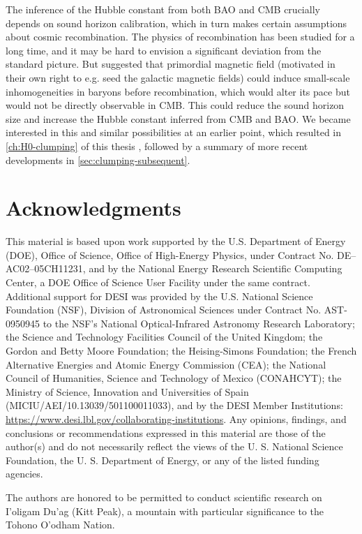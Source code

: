 The inference of the Hubble constant from both BAO and CMB crucially depends on sound horizon calibration, which in turn makes certain assumptions about cosmic recombination.
The physics of recombination has been studied for a long time, and it may be hard to envision a significant deviation from the standard picture.
But \cite{PMF11,PMF13} suggested that primordial magnetic field (motivated in their own right to e.g. seed the galactic magnetic fields) could induce small-scale inhomogeneities in baryons before recombination, which would alter its pace but would not be directly observable in CMB.
This could reduce the sound horizon size and increase the Hubble constant inferred from CMB \citep{JP20} and BAO.
We became interested in this and similar possibilities at an earlier point, which resulted in \cref{ch:H0-clumping} of this thesis \citep[originally published as][]{clumping21}, followed by a summary of more recent developments in \cref{sec:clumping-subsequent}.

\section*{Acknowledgments}

This material is based upon work supported by the U.S. Department of Energy (DOE), Office of Science, Office of High-Energy Physics, under Contract No. DE–AC02–05CH11231, and by the National Energy Research Scientific Computing Center, a DOE Office of Science User Facility under the same contract. Additional support for DESI was provided by the U.S. National Science Foundation (NSF), Division of Astronomical Sciences under Contract No. AST-0950945 to the NSF’s National Optical-Infrared Astronomy Research Laboratory; the Science and Technology Facilities Council of the United Kingdom; the Gordon and Betty Moore Foundation; the Heising-Simons Foundation; the French Alternative Energies and Atomic Energy Commission (CEA); the National Council of Humanities, Science and Technology of Mexico (CONAHCYT); the Ministry of Science, Innovation and Universities of Spain (MICIU/AEI/10.13039/501100011033), and by the DESI Member Institutions: \url{https://www.desi.lbl.gov/collaborating-institutions}. Any opinions, findings, and conclusions or recommendations expressed in this material are those of the author(s) and do not necessarily reflect the views of the U. S. National Science Foundation, the U. S. Department of Energy, or any of the listed funding agencies.

The authors are honored to be permitted to conduct scientific research on I'oligam Du'ag (Kitt Peak), a mountain with particular significance to the Tohono O’odham Nation.
